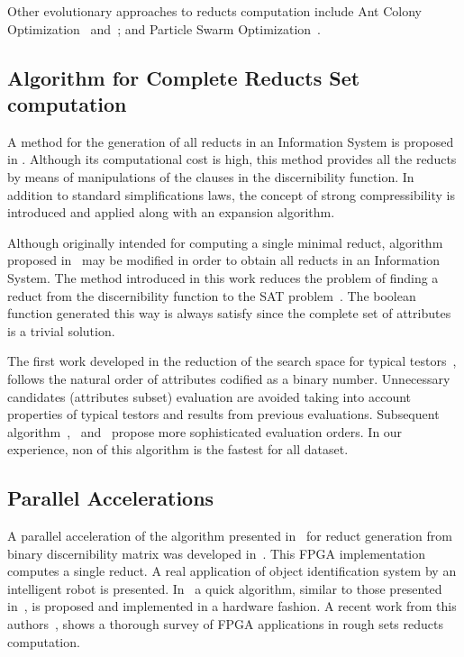 \documentclass[11pt]{article}   %
\begin{document}
  Other evolutionary approaches to reducts computation include Ant Colony Optimization~\cite{Jensen03}
  and~\cite{Chen10}; and Particle Swarm Optimization~\cite{Wang07}.
    
\subsection{Algorithm for Complete Reducts Set computation}
  A method for the generation of all reducts in an Information System is proposed in \cite{Starzyk99,Starzyk00}.
  Although its computational cost is high, this method provides all the reducts by means of manipulations of 
  the clauses in the discernibility function. In addition to standard simplifications laws, the concept of 
  strong compressibility is introduced and applied along with an expansion algorithm.
  
  Although originally intended for computing a single minimal reduct, algorithm proposed in~\cite{Jensen14} may be
  modified in order to obtain all reducts in an Information System. The method introduced in this work reduces
  the problem of finding a reduct from the discernibility function to the SAT problem~\cite{Davis62}. The boolean
  function generated this way is always satisfy since the complete set of attributes is a trivial solution.
 
  The first work developed in the reduction of the search space for typical testors~\cite{Ruiz85}, follows 
  the natural order of attributes codified as a binary number. Unnecessary candidates (attributes subset)
  evaluation are avoided taking into account properties of typical testors and results from previous 
  evaluations. Subsequent algorithm~\cite{Santiesteban03},~\cite{Sanchez07} and~\cite{Lias09} propose
  more sophisticated evaluation orders. In our experience, non of this algorithm is the fastest for all dataset.
  
\subsection{Parallel Accelerations}

  A parallel acceleration of the algorithm presented in~\cite{Yang08} for reduct generation from binary
  discernibility matrix was developed in~\cite{Tiwari11,Tiwari12}. This FPGA implementation computes a 
  single reduct. A real application of object identification system by an intelligent robot is presented.
  In~\cite{Tiwari13} a quick algorithm, similar to those presented in~\cite{Chouchoulas01}, is proposed
  and implemented in a hardware fashion. A recent work from this authors~\cite{Tiwari14}, shows a thorough
  survey of FPGA applications in rough sets reducts computation.
\end{document}
